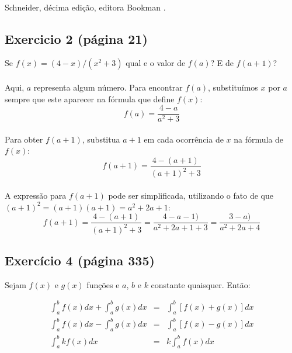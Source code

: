 \documentclass[a4paper,10pt]{report}
\begin{document}
\paragraph{}
Schneider, décima edição, editora Bookman \cite{goldstein2006}.

\subsection{Exercicio 2 (página 21)}
Se $f(x) = (4 - x)/(x^2 + 3)$ qual  e o valor de $f(a)$? E de $f(a + 1)$?

\paragraph{}
Aqui, $a$ representa algum número.  Para encontrar $f(a)$, substituímos $x$ por $a$ sempre que este aparecer na fórmula que define $f(x)$:
\begin{equation}
          f(a)=\frac{4 - a}{a^2 + 3}
\end{equation}

\paragraph{}
Para obter $f(a+ 1)$, substitua $a+ 1$ em cada ocorrência de $x$ na fórmula de $f(x)$:
\begin{equation}
          f(a + 1)=\frac{4 - (a + 1)}{(a + 1)^2 + 3}
\end{equation}

\paragraph{}
A expressão para $f(a+1)$ pode ser simplificada,  utilizando o fato de que $(a+ 1)^2= (a+ 1)(a+ 1) = a^2+ 2a+ 1$: 
\begin{equation}
          f(a + 1)=\frac{4 - (a + 1)}{(a + 1)^2 + 3} = \frac{4 - a - 1)}{a^2 + 2a + 1 + 3} = \frac{3 - a)}{a^2 + 2a + 4}
\end{equation}
      
\subsection{Exercício 4 (página 335)}
Sejam $f(x)$ e $g(x)$ funções e $a$, $b$ e $k$ constante quaisquer. Então:
        
\begin{eqnarray}
          \int_{a}^{b} f(x)dx + \int_{a}^{b} g(x)dx &=& \int_{a}^{b}[f(x) + g(x)]dx\\
          \int_{a}^{b} f(x)dx - \int_{a}^{b} g(x)dx &=& \int_{a}^{b}[f(x) - g(x)]dx\\
          \int_{a}^{b} kf(x)dx &=& k\int_{a}^{b}f(x)dx
\end{eqnarray}
        
\end{document}

